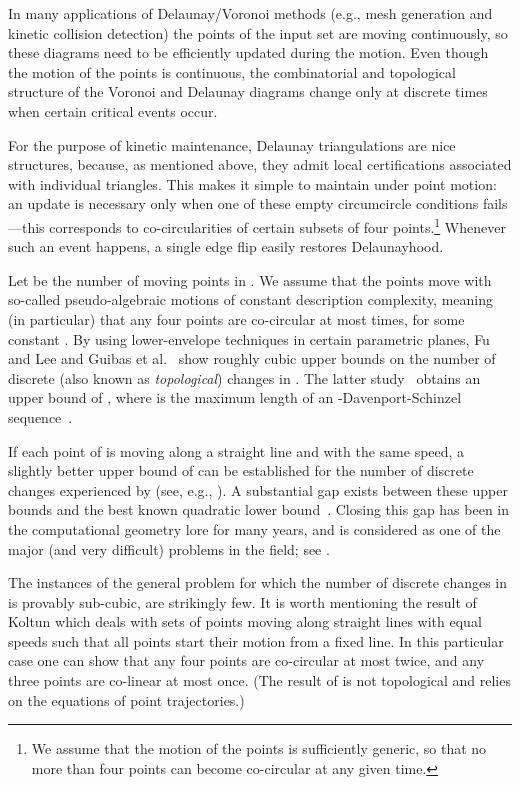 \documentclass[letter,11pt]{article}
\begin{document}
In many applications of Delaunay/Voronoi methods (e.g., mesh generation and kinetic collision detection) the points of the input set  are moving continuously, so
these diagrams need to be efficiently updated during the motion.
Even though the motion of the points is continuous, the combinatorial and topological structure of the Voronoi and
Delaunay diagrams change only at
discrete times when certain critical events occur. 


For the purpose of kinetic maintenance, Delaunay triangulations are 
nice structures, because, as mentioned above, they admit local 
certifications associated with individual triangles.  This makes 
it simple to maintain  under point motion: an update is 
necessary only when one of these empty circumcircle conditions 
fails---this corresponds to co-circularities of certain subsets of
four points.\footnote{We assume that the motion of the points is sufficiently generic, so that no more than four points can become co-circular at any given time.} Whenever such an event happens, 
a single edge flip easily restores Delaunayhood. 



Let  be the number of moving points in . 
We assume that the
points move with so-called pseudo-algebraic motions of constant description complexity, meaning (in particular) that any four points are co-circular at most  times, for some constant .  
By using lower-envelope techniques in certain parametric planes, 
Fu and Lee \cite{FuLee} and
Guibas et al.~\cite{gmr-vdmpp-92} show roughly cubic upper bounds on the number of discrete (also known as \textit{topological}) changes in . 
The latter study~\cite{gmr-vdmpp-92} obtains an upper bound of
, where  is the maximum length
of an -Davenport-Schinzel sequence~\cite{SA95}.


If each point of  is moving along a straight line and with the same speed, a slightly better upper bound of  can be established for the number of discrete changes experienced by  (see, e.g., \cite{Vladlen}). A substantial gap exists between these upper bounds
and the best known quadratic lower bound~\cite{SA95}. Closing this gap has been in the 
computational geometry lore for many years, and is considered as one of the major (and very difficult) problems in the field; see \cite{TOPP}.



The instances of the general problem for which the number of discrete changes in  is provably sub-cubic, are strikingly few. It is worth mentioning the result of Koltun \cite{Vladlen} which deals with sets of points moving along straight lines with equal speeds such that all points start their motion from a fixed line. In this particular case one can show that any four points are co-circular at most twice, and any three points are co-linear at most once. (The result of \cite{Vladlen} is not topological and relies on the equations of point trajectories.)
\end{document}

